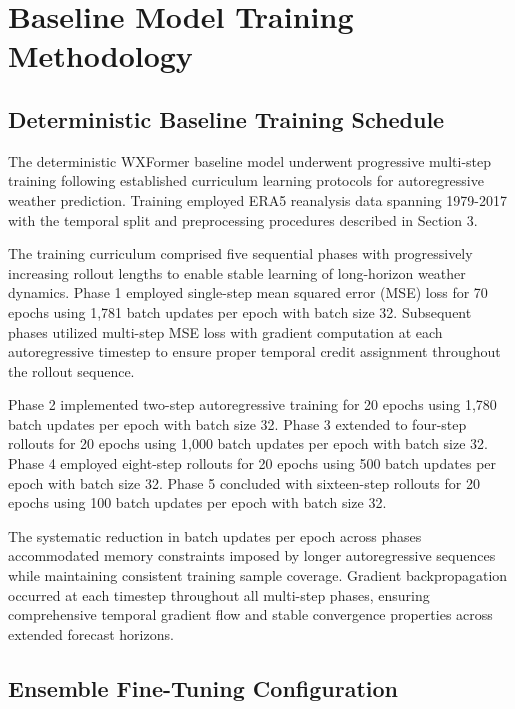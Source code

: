 \documentclass{agujournal2019}
\begin{document}
\appendix

\section{Baseline Model Training Methodology}
\label{sec:train_details}

\subsection{Deterministic Baseline Training Schedule}

The deterministic WXFormer baseline model underwent progressive multi-step training following established curriculum learning protocols for autoregressive weather prediction. Training employed ERA5 reanalysis data spanning 1979-2017 with the temporal split and preprocessing procedures described in Section 3.

The training curriculum comprised five sequential phases with progressively increasing rollout lengths to enable stable learning of long-horizon weather dynamics. Phase 1 employed single-step mean squared error (MSE) loss for 70 epochs using 1,781 batch updates per epoch with batch size 32. Subsequent phases utilized multi-step MSE loss with gradient computation at each autoregressive timestep to ensure proper temporal credit assignment throughout the rollout sequence.

Phase 2 implemented two-step autoregressive training for 20 epochs using 1,780 batch updates per epoch with batch size 32. Phase 3 extended to four-step rollouts for 20 epochs using 1,000 batch updates per epoch with batch size 32. Phase 4 employed eight-step rollouts for 20 epochs using 500 batch updates per epoch with batch size 32. Phase 5 concluded with sixteen-step rollouts for 20 epochs using 100 batch updates per epoch with batch size 32.

The systematic reduction in batch updates per epoch across phases accommodated memory constraints imposed by longer autoregressive sequences while maintaining consistent training sample coverage. Gradient backpropagation occurred at each timestep throughout all multi-step phases, ensuring comprehensive temporal gradient flow and stable convergence properties across extended forecast horizons.

\subsection{Ensemble Fine-Tuning Configuration}
\end{document}
